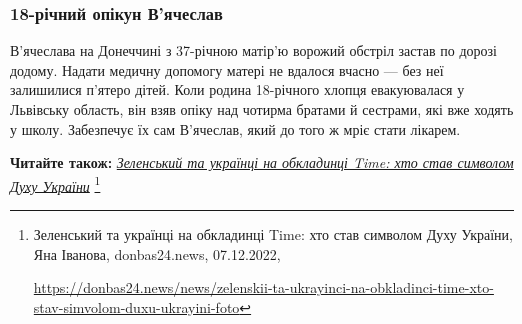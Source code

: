  
 
 
 
 

\subsubsection{18-річний опікун В'ячеслав}


В'ячеслава на Донеччині з 37-річною матір'ю ворожий обстріл застав по дорозі
додому. Надати медичну допомогу матері не вдалося вчасно — без неї залишилися
п'ятеро дітей. Коли родина 18-річного хлопця евакуювалася у Львівську область,
він взяв опіку над чотирма братами й сестрами, які вже ходять у школу.
Забезпечує їх сам В'ячеслав, який до того ж мріє стати лікарем.

\textbf{Читайте також:} \href{https://donbas24.news/news/zelenskii-ta-ukrayinci-na-obkladinci-time-xto-stav-simvolom-duxu-ukrayini-foto}{\emph{Зеленський та українці на обкладинці Time: хто став символом Духу України}}%
\footnote{Зеленський та українці на обкладинці Time: хто став символом Духу України, Яна Іванова, donbas24.news, 07.12.2022, \par%
\url{https://donbas24.news/news/zelenskii-ta-ukrayinci-na-obkladinci-time-xto-stav-simvolom-duxu-ukrayini-foto}%
}
